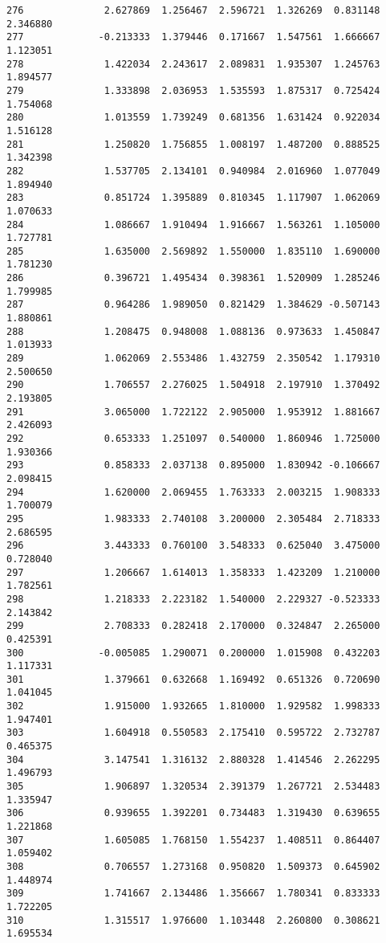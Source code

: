 \documentclass[11pt]{article}
\begin{document}
\begin{Verbatim}[commandchars=\\\{\}]
276              2.627869  1.256467  2.596721  1.326269  0.831148  2.346880
277             -0.213333  1.379446  0.171667  1.547561  1.666667  1.123051
278              1.422034  2.243617  2.089831  1.935307  1.245763  1.894577
279              1.333898  2.036953  1.535593  1.875317  0.725424  1.754068
280              1.013559  1.739249  0.681356  1.631424  0.922034  1.516128
281              1.250820  1.756855  1.008197  1.487200  0.888525  1.342398
282              1.537705  2.134101  0.940984  2.016960  1.077049  1.894940
283              0.851724  1.395889  0.810345  1.117907  1.062069  1.070633
284              1.086667  1.910494  1.916667  1.563261  1.105000  1.727781
285              1.635000  2.569892  1.550000  1.835110  1.690000  1.781230
286              0.396721  1.495434  0.398361  1.520909  1.285246  1.799985
287              0.964286  1.989050  0.821429  1.384629 -0.507143  1.880861
288              1.208475  0.948008  1.088136  0.973633  1.450847  1.013933
289              1.062069  2.553486  1.432759  2.350542  1.179310  2.500650
290              1.706557  2.276025  1.504918  2.197910  1.370492  2.193805
291              3.065000  1.722122  2.905000  1.953912  1.881667  2.426093
292              0.653333  1.251097  0.540000  1.860946  1.725000  1.930366
293              0.858333  2.037138  0.895000  1.830942 -0.106667  2.098415
294              1.620000  2.069455  1.763333  2.003215  1.908333  1.700079
295              1.983333  2.740108  3.200000  2.305484  2.718333  2.686595
296              3.443333  0.760100  3.548333  0.625040  3.475000  0.728040
297              1.206667  1.614013  1.358333  1.423209  1.210000  1.782561
298              1.218333  2.223182  1.540000  2.229327 -0.523333  2.143842
299              2.708333  0.282418  2.170000  0.324847  2.265000  0.425391
300             -0.005085  1.290071  0.200000  1.015908  0.432203  1.117331
301              1.379661  0.632668  1.169492  0.651326  0.720690  1.041045
302              1.915000  1.932665  1.810000  1.929582  1.998333  1.947401
303              1.604918  0.550583  2.175410  0.595722  2.732787  0.465375
304              3.147541  1.316132  2.880328  1.414546  2.262295  1.496793
305              1.906897  1.320534  2.391379  1.267721  2.534483  1.335947
306              0.939655  1.392201  0.734483  1.319430  0.639655  1.221868
307              1.605085  1.768150  1.554237  1.408511  0.864407  1.059402
308              0.706557  1.273168  0.950820  1.509373  0.645902  1.448974
309              1.741667  2.134486  1.356667  1.780341  0.833333  1.722205
310              1.315517  1.976600  1.103448  2.260800  0.308621  1.695534

\end{Verbatim}
\end{document}
